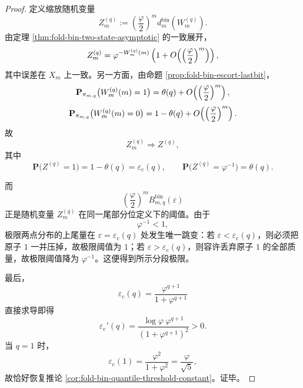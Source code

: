 \begin{proof}
定义缩放随机变量
\[
Z_m^{(q)}
:=
\left(\frac{\varphi}{2}\right)^m d_m^{\mathrm{bin}}(W_m^{(q)}).
\]
由定理 \ref{thm:fold-bin-two-state-asymptotic} 的一致展开，
\[
Z_m^{(q)}
=
\varphi^{-W_m^{(q)}(m)}
\left(1+O\!\left(\Bigl(\frac{\varphi}{2}\Bigr)^m\right)\right),
\]
其中误差在 \(X_m\) 上一致。另一方面，由命题 \ref{prop:fold-bin-escort-lastbit}，
\[
\mathbf P_{\pi_{m,q}}\bigl(W_m^{(q)}(m)=1\bigr)
=
\theta(q)+O\!\left(\Bigl(\frac{\varphi}{2}\Bigr)^m\right),
\]
\[
\mathbf P_{\pi_{m,q}}\bigl(W_m^{(q)}(m)=0\bigr)
=
1-\theta(q)+O\!\left(\Bigl(\frac{\varphi}{2}\Bigr)^m\right).
\]
故
\[
Z_m^{(q)}\Longrightarrow Z^{(q)},
\]
其中
\[
\mathbf P\bigl(Z^{(q)}=1\bigr)=1-\theta(q)=\varepsilon_{\mathrm c}(q),
\qquad
\mathbf P\bigl(Z^{(q)}=\varphi^{-1}\bigr)=\theta(q).
\]

而
\[
\left(\frac{\varphi}{2}\right)^m B_{m,q}^{\mathrm{bin}}(\varepsilon)
\]
正是随机变量 \(Z_m^{(q)}\) 在同一尾部分位定义下的阈值。由于
\[
\varphi^{-1}<1,
\]
极限两点分布的上尾量在 \(\varepsilon=\varepsilon_{\mathrm c}(q)\) 处发生唯一跳变：若 \(\varepsilon<\varepsilon_{\mathrm c}(q)\)，则必须把原子 \(1\) 一并压掉，故极限阈值为 \(1\)；若 \(\varepsilon>\varepsilon_{\mathrm c}(q)\)，则容许丢弃原子 \(1\) 的全部质量，故极限阈值降为 \(\varphi^{-1}\)。这便得到所示分段极限。

最后，
\[
\varepsilon_{\mathrm c}(q)=\frac{\varphi^{q+1}}{1+\varphi^{q+1}}
\]
直接求导即得
\[
\varepsilon_{\mathrm c}'(q)
=
\frac{\log\varphi\ \varphi^{q+1}}{(1+\varphi^{q+1})^2}>0.
\]
当 \(q=1\) 时，
\[
\varepsilon_{\mathrm c}(1)
=
\frac{\varphi^2}{1+\varphi^2}
=
\frac{\varphi}{\sqrt5},
\]
故恰好恢复推论 \ref{cor:fold-bin-quantile-threshold-constant}。证毕。
\end{proof}

